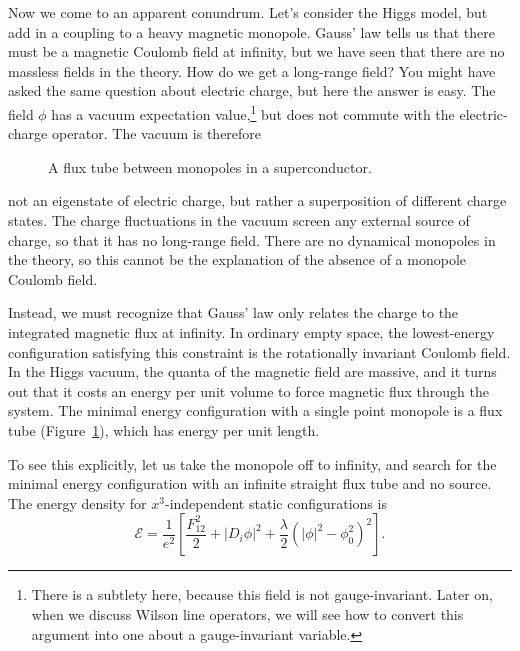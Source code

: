 Now we come to an apparent conundrum. Let's consider the Higgs model, but add
in a coupling to a heavy magnetic monopole. Gauss' law tells us that there must
be a magnetic Coulomb field at infinity, but we have seen that there are no
massless fields in the theory. How do we get a long-range field? You might have
asked the same question about electric charge, but here the answer is easy. The
field $\phi$ has a vacuum expectation value,\footnote[9]{There is a subtlety here,
because this field is not gauge-invariant. Later on, when we discuss Wilson line
operators, we will see how to convert this argument into one about a
gauge-invariant variable.} but does not commute with the electric-charge
operator. The vacuum is therefore

\begin{figure}[htbp]
  \centering
  
  \caption{A flux tube between monopoles in a superconductor.}
  \label{fig:8.2}
\end{figure}

not an eigenstate of electric charge, but rather a superposition of different
charge states. The charge fluctuations in the vacuum screen any external source
of charge, so that it has no long-range field. There are no dynamical monopoles
in the theory, so this cannot be the explanation of the absence of a monopole
Coulomb field.

Instead, we must recognize that Gauss' law only relates the charge to the
integrated magnetic flux at infinity. In ordinary empty space, the lowest-energy
configuration satisfying this constraint is the rotationally invariant Coulomb
field. In the Higgs vacuum, the quanta of the magnetic field are massive, and it
turns out that it costs an energy per unit volume to force magnetic flux through
the system. The minimal energy configuration with a single point monopole is a
flux tube (Figure~\ref{fig:8.2}), which has energy per unit length.

To see this explicitly, let us take the monopole off to infinity, and search for
the minimal energy configuration with an infinite straight flux tube and no
source. The energy density for $x^3$-independent static configurations is
\begin{equation}
  \mathcal E=\frac{1}{e^2}\left[\frac{F_{12}^2}{2}+|D_i\phi|^2
  +\frac{\lambda}{2}(|\phi|^2-\phi_0^2)^2\right].
  \label{eq:8.1}
\end{equation}

